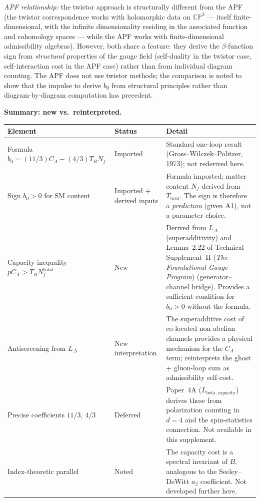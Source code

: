 \documentclass[11pt]{article}
\theoremstyle{definition}
\newcommand{\TSII}{Technical Supplement~II (\emph{The Foundational Gauge Program})}
\begin{document}
\textit{APF relationship:} the twistor approach is structurally
different from the APF (the twistor correspondence works with
holomorphic data on $\mathbb{CP}^3$ --- itself finite-dimensional,
with the infinite dimensionality residing in the associated function
and cohomology spaces --- while the APF works with finite-dimensional
admissibility algebras).  However, both share a feature: they derive
the $\beta$-function sign from \emph{structural} properties of the
gauge field (self-duality in the twistor case, self-interaction cost
in the APF case) rather than from individual diagram counting.  The
APF does not use twistor methods; the comparison is noted to show
that the impulse to derive $b_0$ from structural principles rather
than diagram-by-diagram computation has precedent.

\smallskip\noindent\textbf{Summary: new vs.\ reinterpreted.}\quad

\begin{center}\small
\renewcommand{\arraystretch}{1.2}
\begin{tabular}{@{}p{4.5cm}p{1.8cm}p{6.5cm}@{}}
\toprule
\textbf{Element} & \textbf{Status} & \textbf{Detail} \\
\midrule
Formula $b_0 = (11/3)C_A - (4/3)T_R N_f$ &
  Imported &
  Standard one-loop result (Gross--Wilczek--Politzer, 1973);
  not rederived here. \\[3pt]
Sign $b_0 > 0$ for SM content &
  Imported + derived inputs &
  Formula imported; matter content $N_f$ derived from
  $T_{\mathrm{field}}$.  The sign is therefore a \emph{prediction}
  (given A1), not a parameter choice. \\[3pt]
Capacity inequality $p C_A > T_R N_f^{\mathrm{total}}$ &
  New &
  Derived from $L_\Delta$ (superadditivity) and
  Lemma~2.22 of \TSII{} (generator--channel bridge).
  Provides a sufficient condition for $b_0 > 0$ without the
  formula. \\[3pt]
Antiscreening from $L_\Delta$ &
  New interpretation &
  The superadditive cost of co-located non-abelian channels
  provides a physical mechanism for the $C_A$ term;
  reinterprets the ghost + gluon-loop sum as admissibility
  self-cost. \\[3pt]
Precise coefficients $11/3$, $4/3$ &
  Deferred &
  Paper~4A ($L_{\mathrm{beta,capacity}}$) derives these from
  polarization counting in $d = 4$ and the spin-statistics
  connection.  Not available in this supplement. \\[3pt]
Index-theoretic parallel &
  Noted &
  The capacity cost is a spectral invariant of $B$, analogous
  to the Seeley--DeWitt $a_2$ coefficient.  Not developed
  further here. \\
\bottomrule
\end{tabular}
\end{center}
\end{document}
